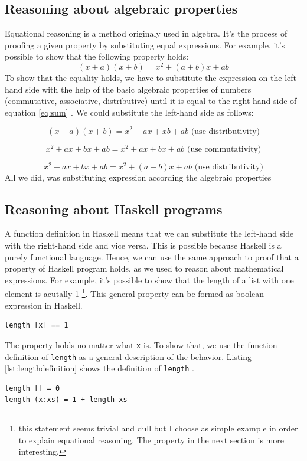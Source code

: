 \subsection{Reasoning about algebraic properties}

Equational reasoning is a method originaly used in algebra. It's the process of proofing a given property by substituting equal expressions.
For example, it's possible to show that the following property holds:
\begin{equation}
  \label{eq:sum}
  (x+a)(x+b) = x^2 + (a+b)x+ab
\end{equation}
To show that the equality holds, we have to substitute the expression on the left-hand side with the help of the basic algebraic properties of numbers (commutative, associative, distributive) until it is equal to the right-hand side of equation \ref{eq:sum} \cite{hutton}. We could substitute the left-hand side as follows:

\begin{equation}
  \label{eq:algebra}
  (x+a)(x+b) = x^2 + ax + xb + ab \text{     (use distributivity)}
\end{equation}

\begin{equation}
x^2 + ax + bx + ab = x^2 + ax + bx + ab \text{     (use commutativity)}
\end{equation}

\begin{equation}
x^2 + ax + bx + ab = x^2 + (a + b)x + ab \text{     (use distributivity)}
\end{equation}
All we did, was substituting expression according the algebraic properties 

\subsection{Reasoning about Haskell programs}

A function definition in Haskell means that we can substitute the left-hand side with the right-hand side and vice versa. This is possible because Haskell is a purely functional language. Hence, we can use the same approach to proof that a property of Haskell program holds, as we used to reason about mathematical expressions. 
For example, it's possible to show that the length of a list with one element is acutally 1 \footnote{this statement seems trivial and dull but I choose as simple example in order to explain equational reasoning. The property in the next section is more interesting.}. This general property can be formed as boolean expression in Haskell.
\begin{verbatim}
length [x] == 1
\end{verbatim}
The property holds no matter what \verb|x| is. To show that, we use the \gls{function-definition} of \verb|length| as a general description of the behavior. Listing \ref{lst:lengthdefinition} shows the definition of \verb|length| \cite{hutton}.
\begin{lstlisting}[caption={function definition of length},label={lst:lengthdefinition}]
length [] = 0
length (x:xs) = 1 + length xs  
\end{lstlisting}

